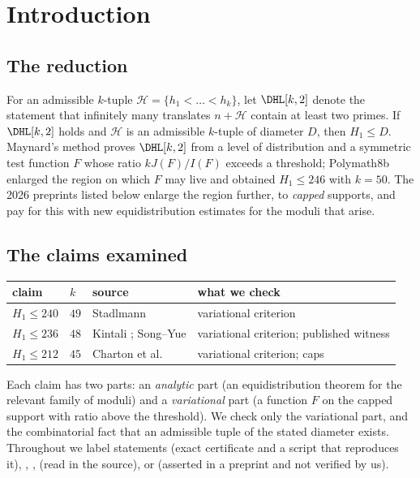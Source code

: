 \section{Introduction}

\subsection*{The reduction}
For an admissible $k$-tuple $\mathcal H=\{h_1<\dots<h_k\}$, let $\DHL[k,2]$
denote the statement that infinitely many translates $n+\mathcal H$ contain at
least two primes. If $\DHL[k,2]$ holds and $\mathcal H$ is an admissible
$k$-tuple of diameter $D$, then $H_1\le D$. Maynard's method \cite{May15}
proves $\DHL[k,2]$ from a level of distribution and a symmetric test function
$F$ whose ratio $kJ(F)/I(F)$ exceeds a threshold; Polymath8b \cite{Pol14b}
enlarged the region on which $F$ may live and obtained $H_1\le246$ with
$k=50$. The 2026 preprints listed below enlarge the region further, to
\emph{capped} supports, and pay for this with new equidistribution estimates
for the moduli that arise.

\subsection*{The claims examined}
\begin{center}
\begin{tabular}{@{}llll@{}}
\toprule
claim & $k$ & source & what we check\\
\midrule
$H_1\le240$ & $49$ & Stadlmann \cite{Sta26} & variational criterion\\
$H_1\le236$ & $48$ & Kintali \cite{Kin26}; Song--Yue \cite{SY26} & variational criterion; published witness\\
$H_1\le212$ & $45$ & Charton et al.\ \cite{Cha26} & variational criterion; caps\\
\bottomrule
\end{tabular}
\end{center}
Each claim has two parts: an \emph{analytic} part (an equidistribution
theorem for the relevant family of moduli) and a \emph{variational} part (a
function $F$ on the capped support with ratio above the threshold). We check
only the variational part, and the combinatorial fact that an admissible
tuple of the stated diameter exists. Throughout we label statements
 (exact certificate and a script that reproduces it),
, ,  (read in the source),
or  (asserted in a preprint and not verified by us).

